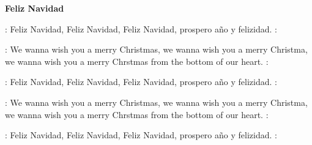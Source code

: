 \documentclass[10pt]{article}
\begin{document}
{\Large
\begin{guitar}
    \textbf{Feliz Navidad}


    \textbar: Feliz Navidad, Feliz Navidad,
    Feliz Navidad, prospero año y felizidad. :\textbar


    \textbar: We wanna wish you a merry Christmas,
    we wanna wish you a merry Christma,
    we wanna wish you a merry Chrstmas
    from the bottom of our heart. :\textbar


    \textbar: Feliz Navidad, Feliz Navidad,
    Feliz Navidad, prospero año y felizidad. :\textbar


    \textbar: We wanna wish you a merry Christmas,
    we wanna wish you a merry Christma,
    we wanna wish you a merry Chrstmas
    from the bottom of our heart. :\textbar


    \textbar: Feliz Navidad, Feliz Navidad,
    Feliz Navidad, prospero año y felizidad. :\textbar
\end{guitar}
}
\end{document}
